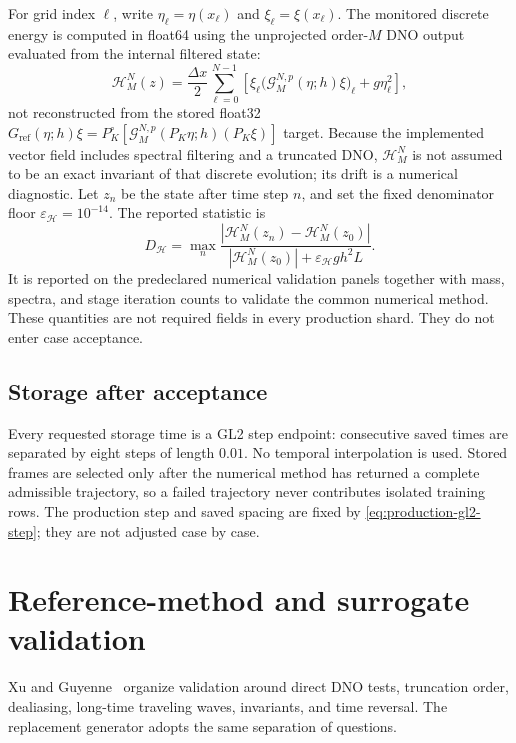 \documentclass[11pt]{article}
\newcommand{\G}{\mathcal G}
\newcommand{\eps}{\varepsilon}
\begin{document}
For grid index $\ell$, write $\eta_\ell=\eta(x_\ell)$ and
$\xi_\ell=\xi(x_\ell)$.  The monitored discrete energy is computed in
float64 using the unprojected order-$M$ DNO output evaluated from the internal
filtered state:
\begin{equation}
  \mathcal H_M^N(z)
  =\frac{\Delta x}{2}\sum_{\ell=0}^{N-1}
    \left[
      \xi_\ell\bigl(\G_M^{N,p}(\eta;h)\xi\bigr)_\ell
      +g\eta_\ell^2
    \right],
  \label{eq:discrete-hamiltonian}
\end{equation}
not reconstructed from the stored float32
$G_{\mathrm{ref}}(\eta;h)\xi=P_K^\circ[
\G_M^{N,p}(P_K\eta;h)(P_K\xi)]$ target.  Because the
implemented vector field includes spectral filtering and a truncated DNO,
$\mathcal H_M^N$ is not assumed to be an exact invariant of that discrete evolution;
its drift is a numerical diagnostic.
Let $z_n$ be the state after time step $n$, and set the fixed denominator
floor $\eps_{\mathcal H}=10^{-14}$.  The reported statistic is
\begin{equation}
  D_{\mathcal H}
  =\max_n
   \frac{|\mathcal H_M^N(z_n)-\mathcal H_M^N(z_0)|}
        {|\mathcal H_M^N(z_0)|+\eps_{\mathcal H} g h^2L}.
  \label{eq:hamiltonian-drift}
\end{equation}
It is reported on the predeclared numerical validation panels together with
mass, spectra, and stage iteration counts to validate the common numerical
method.  These quantities are not required fields in every production shard.
They do not enter case acceptance.

\subsection{Storage after acceptance}

Every requested storage time is a GL2 step endpoint: consecutive saved times
are separated by eight steps of length $0.01$.  No temporal interpolation is
used.  Stored frames are selected only
after the numerical method has returned a complete admissible trajectory, so
a failed trajectory never contributes isolated training rows.  The
production step and saved spacing are fixed by
\eqref{eq:production-gl2-step}; they are not adjusted case by case.

\section{Reference-method and surrogate validation}
\label{sec:validation}

Xu and Guyenne~\cite{xu2009} organize validation around direct DNO tests,
truncation order, dealiasing, long-time traveling waves, invariants, and time
reversal.  The replacement generator adopts the same separation of
questions.
\end{document}
